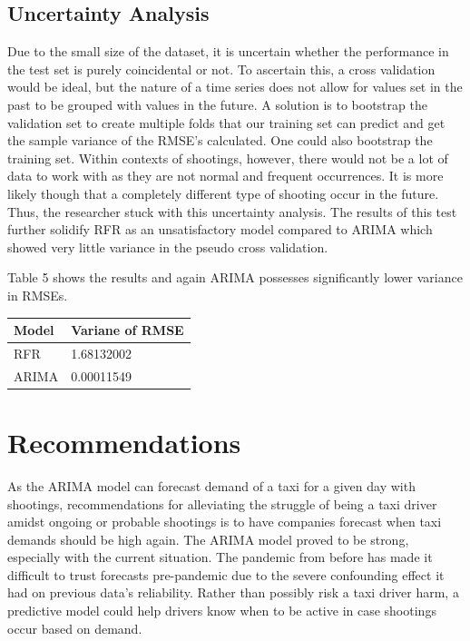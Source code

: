 \documentclass[11pt]{article}
\begin{document}
\subsection{Uncertainty Analysis}

Due to the small size of the dataset, it is uncertain whether the performance in the test set is purely coincidental or not. To ascertain this, a cross validation would be ideal, but the nature of a time series does not allow for values set in the past to be grouped with values in the future. A solution is to bootstrap the validation set to create multiple folds that our training set can predict and get the sample variance of the RMSE's calculated. One could also bootstrap the training set. Within contexts of shootings, however,  there would not be a lot of data to work with as they are not normal and frequent occurrences. It is more likely though that a completely different type of shooting occur in the future. Thus, the researcher stuck with this uncertainty analysis. The results of this test further solidify RFR as an unsatisfactory model compared to ARIMA which showed very little variance in the pseudo cross validation.

Table 5 shows the results and again ARIMA possesses significantly lower variance in RMSEs. 
    \begin{center}
    \begin{tabular}[h]{|l|l|}
        \hline
        Model & Variane of RMSE \\
        \hline\hline
        RFR & 1.68132002 \\
        ARIMA & 0.00011549 \\
        \hline
    \end{tabular}
    \label{table4}
    \end{center}

\section{Recommendations}

As the ARIMA model can forecast demand of a taxi for a given day with shootings, recommendations for alleviating the struggle of being a taxi driver amidst ongoing or probable shootings is to have companies forecast when taxi demands should be high again. The ARIMA model proved to be strong, especially with the current situation. The pandemic from before has made it difficult to trust forecasts pre-pandemic due to the severe confounding effect it had on previous data's reliability. Rather than possibly risk a taxi driver harm, a predictive model could help drivers know when to be active in case shootings occur based on demand. 
\end{document}
